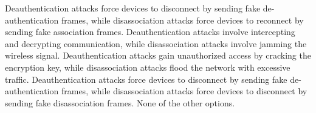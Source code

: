 \begin{checkboxes}
    \choice Deauthentication attacks force devices to disconnect by sending fake de-authentication frames, while disassociation attacks force devices to reconnect by sending fake association frames.
    \choice Deauthentication attacks involve intercepting and decrypting communication, while disassociation attacks involve jamming the wireless signal.
    \choice Deauthentication attacks gain unauthorized access by cracking the encryption key, while disassociation attacks flood the network with excessive traffic.
    \CorrectChoice Deauthentication attacks force devices to disconnect by sending fake de-authentication frames, while disassociation attacks force devices to disconnect by sending fake disassociation frames.
    \choice None of the other options.
\end{checkboxes}